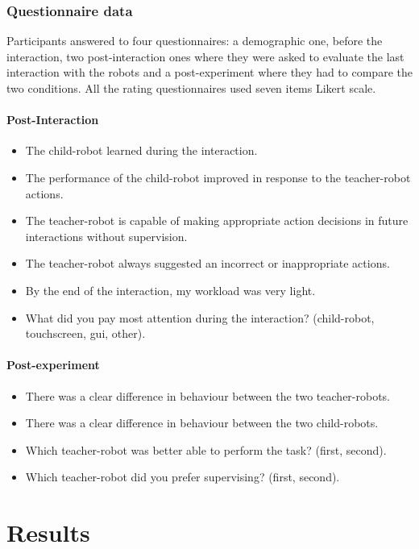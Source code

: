 \subsubsection{Questionnaire data}
 
Participants answered to four questionnaires: a demographic one, before the interaction, two post-interaction ones where they were asked to evaluate the last interaction with the robots and a post-experiment where they had to compare the two conditions. All the rating questionnaires used seven items Likert scale.

\paragraph{Post-Interaction}
\begin{itemize}
	\item The child-robot learned during the interaction.
	\item The performance of the child-robot improved in response to the teacher-robot actions.
	\item The teacher-robot is capable of making appropriate action decisions in future interactions without supervision.
	\item The teacher-robot always suggested an incorrect or inappropriate actions.
	\item By the end of the interaction, my workload was very light.
	\item What did you pay most attention during the interaction? (child-robot, touchscreen, \gls{gui}, other).
\end{itemize}

\paragraph{Post-experiment}
\begin{itemize}
	\item There was a clear difference in behaviour between the two teacher-robots.
	\item There was a clear difference in behaviour between the two child-robots.
	\item Which teacher-robot was better able to perform the task? (first, second).
	\item Which teacher-robot did you prefer supervising? (first, second).
\end{itemize}

\section{Results}


